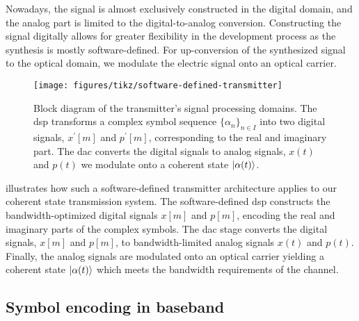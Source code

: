 Nowadays, the signal is almost exclusively constructed in the digital domain, and the analog part is limited to the digital-to-analog conversion.
Constructing the signal digitally allows for greater flexibility in the development process as the synthesis is mostly software-defined.
For up-conversion of the synthesized signal to the optical domain, we modulate the electric signal onto an optical carrier.
\begin{figure}[htb]
	\centering
	\texttt{[image: figures/tikz/software-defined-transmitter]}
	\caption{Block diagram of the transmitter's signal processing domains. The \gls{dsp} transforms a complex symbol sequence $\{\alpha_n\}_{n\in I}$ into two digital signals, $x^\prime[m]$ and $p^\prime[m]$, corresponding to the real and imaginary part. The \gls{dac} converts the digital signals to analog signals, $x(t)$ and $p(t)$ we modulate onto a coherent state $\lvert\alpha(t)\rangle$.}\label{fig:software_defined_transmitter}
\end{figure}
 illustrates how such a software-defined transmitter architecture applies to our coherent state transmission system.
The software-defined \gls{dsp} constructs the bandwidth-optimized digital signals $x[m]$ and $p[m]$, encoding the real and imaginary parts of the complex symbols.
The \gls{dac} stage converts the digital signals, $x[m]$ and $p[m]$, to bandwidth-limited analog signals $x(t)$ and $p(t)$.
Finally, the analog signals are modulated onto an optical carrier yielding a coherent state $\lvert\alpha(t)\rangle$ which meets the bandwidth requirements of the channel.

\subsection{Symbol encoding in baseband}

